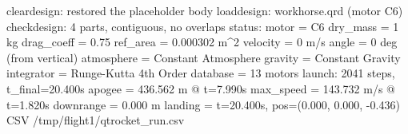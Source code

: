 \begin{console}
\ok cleardesign: restored the placeholder body
\ok loaddesign: workhorse.qrd (motor C6)
\ok checkdesign: 4 parts, contiguous, no overlaps
\ok status:
  motor      = C6
  dry_mass   = 1 kg
  drag_coeff = 0.75
  ref_area   = 0.000302 m^2
  velocity   = 0 m/s
  angle      = 0 deg (from vertical)
  atmosphere = Constant Atmosphere
  gravity    = Constant Gravity
  integrator = Runge-Kutta 4th Order
  database   = 13 motors
\ok launch: 2041 steps, t_final=20.400s
  apogee    = 436.562 m @ t=7.990s
  max_speed = 143.732 m/s @ t=1.820s
  downrange = 0.000 m
  landing   = t=20.400s, pos=(0.000, 0.000, -0.436)
CSV /tmp/flight1/qtrocket_run.csv
\end{console}
